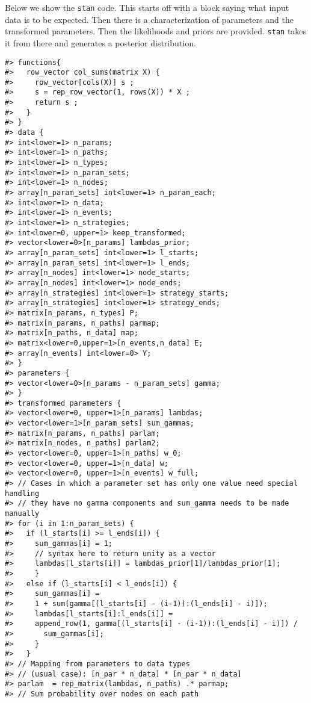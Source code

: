 \documentclass[
  11pt,
  article]{jss}
\begin{document}
Below we show the \texttt{stan} code. This starts off with a block
saying what input data is to be expected. Then there is a
characterization of parameters and the transformed parameters. Then the
likelihoods and priors are provided. \texttt{stan} takes it from there
and generates a posterior distribution.

\begin{verbatim}
#> functions{
#>   row_vector col_sums(matrix X) {
#>     row_vector[cols(X)] s ;
#>     s = rep_row_vector(1, rows(X)) * X ;
#>     return s ;
#>   }
#> }
#> data {
#> int<lower=1> n_params;
#> int<lower=1> n_paths;
#> int<lower=1> n_types;
#> int<lower=1> n_param_sets;
#> int<lower=1> n_nodes;
#> array[n_param_sets] int<lower=1> n_param_each;
#> int<lower=1> n_data;
#> int<lower=1> n_events;
#> int<lower=1> n_strategies;
#> int<lower=0, upper=1> keep_transformed;
#> vector<lower=0>[n_params] lambdas_prior;
#> array[n_param_sets] int<lower=1> l_starts;
#> array[n_param_sets] int<lower=1> l_ends;
#> array[n_nodes] int<lower=1> node_starts;
#> array[n_nodes] int<lower=1> node_ends;
#> array[n_strategies] int<lower=1> strategy_starts;
#> array[n_strategies] int<lower=1> strategy_ends;
#> matrix[n_params, n_types] P;
#> matrix[n_params, n_paths] parmap;
#> matrix[n_paths, n_data] map;
#> matrix<lower=0,upper=1>[n_events,n_data] E;
#> array[n_events] int<lower=0> Y;
#> }
#> parameters {
#> vector<lower=0>[n_params - n_param_sets] gamma;
#> }
#> transformed parameters {
#> vector<lower=0, upper=1>[n_params] lambdas;
#> vector<lower=1>[n_param_sets] sum_gammas;
#> matrix[n_params, n_paths] parlam;
#> matrix[n_nodes, n_paths] parlam2;
#> vector<lower=0, upper=1>[n_paths] w_0;
#> vector<lower=0, upper=1>[n_data] w;
#> vector<lower=0, upper=1>[n_events] w_full;
#> // Cases in which a parameter set has only one value need special handling
#> // they have no gamma components and sum_gamma needs to be made manually
#> for (i in 1:n_param_sets) {
#>   if (l_starts[i] >= l_ends[i]) {
#>     sum_gammas[i] = 1;
#>     // syntax here to return unity as a vector
#>     lambdas[l_starts[i]] = lambdas_prior[1]/lambdas_prior[1];
#>     }
#>   else if (l_starts[i] < l_ends[i]) {
#>     sum_gammas[i] =
#>     1 + sum(gamma[(l_starts[i] - (i-1)):(l_ends[i] - i)]);
#>     lambdas[l_starts[i]:l_ends[i]] =
#>     append_row(1, gamma[(l_starts[i] - (i-1)):(l_ends[i] - i)]) /
#>       sum_gammas[i];
#>     }
#>   }
#> // Mapping from parameters to data types
#> // (usual case): [n_par * n_data] * [n_par * n_data]
#> parlam  = rep_matrix(lambdas, n_paths) .* parmap;
#> // Sum probability over nodes on each path

\end{verbatim}
\end{document}
